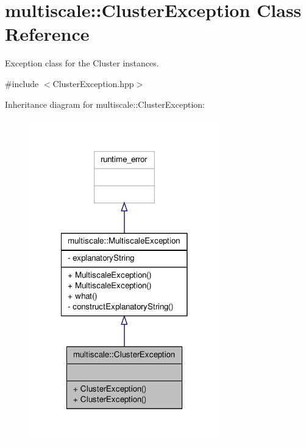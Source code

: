 \hypertarget{classmultiscale_1_1ClusterException}{\section{multiscale\-:\-:Cluster\-Exception Class Reference}
\label{classmultiscale_1_1ClusterException}
}


Exception class for the Cluster instances.  




{\ttfamily \#include $<$Cluster\-Exception.\-hpp$>$}



Inheritance diagram for multiscale\-:\-:Cluster\-Exception\-:\nopagebreak
\begin{figure}[H]
\begin{center}
\leavevmode
\includegraphics[width=234pt]{classmultiscale_1_1ClusterException__inherit__graph}
\end{center}
\end{figure}


